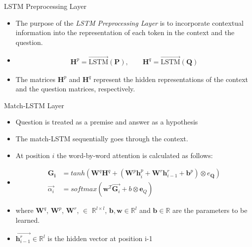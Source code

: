 \documentclass[10pt]{beamer}
\def\*#1{\mathbf{#1}}
\newcommand{\et}[1]{\textit{#1}}
\begin{document}
\begin{frame}[fragile]{LSTM Preprocessing Layer}

	\begin{itemize}[<+- | alert@+>]
		\item The purpose of the \et{LSTM Preprocessing Layer} is to incorporate contextual information into the representation of each token in the context and the question.
		\item \begin{align*}
				\boldsymbol{H}^p = \overrightarrow{\text{LSTM}}(\boldsymbol{P}), \quad\quad
				\boldsymbol{H}^q	=	\overrightarrow{\text{LSTM}}(\boldsymbol{Q})
			\end{align*}
		\item The matrices $\boldsymbol{H}^p$ and $\boldsymbol{H}^q$ represent the hidden representations of the context and the question matrices, respectively.
	\end{itemize}
\end{frame}

\begin{frame}{Match-LSTM Layer}
	\begin{itemize}[<+- | alert@+>]
		\item Question is treated as a premise and answer as a hypothesis
		\item The match-LSTM sequentially goes through the context.
		\item At position $i$ the word-by-word attention is calculated as follows:
		\item
			\begin{align*}
				\boldsymbol{G_i} &= tanh(\*W^q\*H^q + (\*W^p\*h_i^p+\*W^r\*h_{i-1}^r+\*b^p)\otimes e_{\*Q})\\
				\overrightarrow{\alpha_i} & = softmax(\*w^T\overrightarrow{\*G_i}+b\otimes\*e_Q)
			\end{align*}
		\item where $\*W^q$, $\*W^p$, $\*W^r$, $\in$ $\mathbb{R}^{l\times l}$, $\*b,\*w \in \mathbb{R}^l$ and $\*b \in \mathbb{R}$ are the parameters to be learned.
		\item $\overrightarrow{\*h_{i-1}^{r}} \in \mathbb{R}^l$ is the hidden vector at position i-1
	\end{itemize}
\end{frame}
\end{document}
